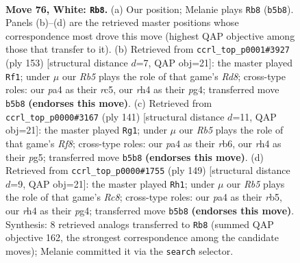 \documentclass[11pt]{article}
\begin{document}
\clearpage

\begin{figure}[p]\centering
\begin{subfigure}{0.46\textwidth}\centering
\resizebox{\linewidth}{!}{%
\newchessgame
\chessboard[
  setfen={6n1/3k4/8/1R6/p6r/P6p/7K/8 w - - 10 76},
  showmover=false,
  pgfstyle=straightmove, color=movearrow, markmove={b5-b8}
]}
\caption{}
\end{subfigure}\hfill
\begin{subfigure}{0.46\textwidth}\centering
\resizebox{\linewidth}{!}{%
\newchessgame
\chessboard[
  setfen={8/8/5p1k/2R4P/6P1/8/7K/3r4 b - - 14 77},
  showmover=false,
  pgfstyle=straightmove, color=movearrow, markmove={d1-f1}
]}
\caption{}
\end{subfigure}
\\[4pt]
\begin{subfigure}{0.46\textwidth}\centering
\resizebox{\linewidth}{!}{%
\newchessgame
\chessboard[
  setfen={8/5p1k/1R5P/6P1/8/2K5/8/5r2 b - - 2 71},
  showmover=false,
  pgfstyle=straightmove, color=movearrow, markmove={f1-g1}
]}
\caption{}
\end{subfigure}\hfill
\begin{subfigure}{0.46\textwidth}\centering
\resizebox{\linewidth}{!}{%
\newchessgame
\chessboard[
  setfen={8/8/5p1k/1R5P/6P1/6K1/8/2r5 b - - 12 75},
  showmover=false,
  pgfstyle=straightmove, color=movearrow, markmove={c1-h1}
]}
\caption{}
\end{subfigure}
\caption{\textbf{Move 76, White: \texttt{Rb8}.} (a) Our position; Melanie plays \texttt{Rb8} (\texttt{b5b8}). Panels (b)--(d) are the retrieved master positions whose correspondence most drove this move (highest QAP objective among those that transfer to it). (b) Retrieved from \texttt{ccrl\_top\_p0001\#3927} (ply 153) [structural distance $d$=7, QAP obj=21]: the master played \texttt{Rf1}; under $\mu$ our \emph{Rb5} plays the role of that game's \emph{Rd8}; cross-type roles: our \emph{p}a4 as their \emph{r}c5, our \emph{r}h4 as their \emph{p}g4; transferred move \texttt{b5b8} \textbf{(endorses this move)}. (c) Retrieved from \texttt{ccrl\_top\_p0000\#3167} (ply 141) [structural distance $d$=11, QAP obj=21]: the master played \texttt{Rg1}; under $\mu$ our \emph{Rb5} plays the role of that game's \emph{Rf8}; cross-type roles: our \emph{p}a4 as their \emph{r}b6, our \emph{r}h4 as their \emph{p}g5; transferred move \texttt{b5b8} \textbf{(endorses this move)}. (d) Retrieved from \texttt{ccrl\_top\_p0000\#1755} (ply 149) [structural distance $d$=9, QAP obj=21]: the master played \texttt{Rh1}; under $\mu$ our \emph{Rb5} plays the role of that game's \emph{Rc8}; cross-type roles: our \emph{p}a4 as their \emph{r}b5, our \emph{r}h4 as their \emph{p}g4; transferred move \texttt{b5b8} \textbf{(endorses this move)}. Synthesis: 8 retrieved analogs transferred to \texttt{Rb8} (summed QAP objective 162, the strongest correspondence among the candidate moves); Melanie committed it via the \texttt{search} selector.}
\label{fig:thought-m150}
\end{figure}
\end{document}
